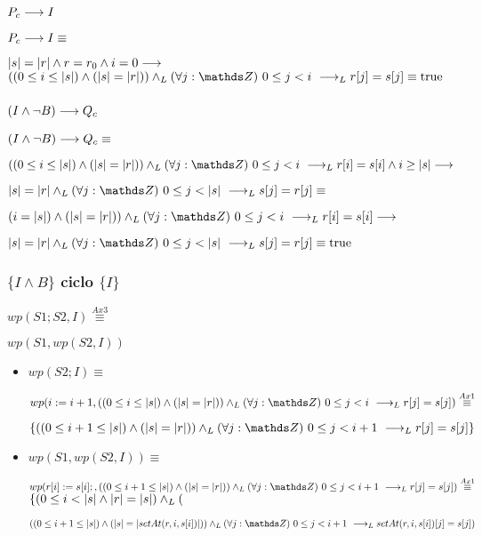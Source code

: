 \documentclass{article}
\begin{document}
\subsubsection*{$P_{c} \longrightarrow I$}

$P_{c} \longrightarrow I \equiv$

$|s| = |r| \wedge r = r_{0} \wedge i = 0 \longrightarrow$
$((0 \leq i \leq \longitud{s}) \wedge (\longitud{s} = \longitud{r})) \yLuego \paraTodo{j}{0}{i} \implicaLuego r[j] = s[j] \equiv \True$

\subsubsection*{$(I \wedge \neg B) \longrightarrow Q_{c}$}

$(I \wedge \neg B) \longrightarrow Q_{c} \equiv \\$

$((0 \leq i \leq \longitud{s}) \wedge (\longitud{s} = \longitud{r})) \yLuego \paraTodo{j}{0}{i} \implicaLuego r[i] = s[i] \wedge i \geq \longitud{s} \implica$

$\longitud{s} = \longitud{r} \yLuego \paraTodo{j}{0}{\longitud{s}} \implicaLuego s[j] = r[j] \equiv \\$

$(i = \longitud{s}) \wedge (\longitud{s} = \longitud{r})) \yLuego \paraTodo{j}{0}{i} \implicaLuego r[i] = s[i] \implica$

$\longitud{s} = \longitud{r} \yLuego \paraTodo{j}{0}{\longitud{s}} \implicaLuego s[j] = r[j] \equiv \True$

\subsubsection*{$\{I \wedge B\}$ ciclo $\{ I \}$}

$wp(S1;S2, I) \stackrel{Ax3}{\equiv}$

$wp(S1, wp(S2, I))$

\begin{itemize}
    \item $wp(S2; I) \equiv$

    $wp(i:= i+1, ((0 \leq i \leq \longitud{s}) \wedge (\longitud{s} = \longitud{r})) \yLuego \paraTodo{j}{0}{i} \implicaLuego r[j] = s[j]) \stackrel{Ax1}{\equiv}$

    $\{((0 \leq i+1 \leq \longitud{s}) \wedge (\longitud{s} = \longitud{r})) \yLuego \paraTodo{j}{0}{i+1} \implicaLuego r[j] = s[j] \}$

    \item $wp(S1, wp(S2, I)) \equiv$

    $wp(r[i] := s[i];, ((0 \leq i+1 \leq \longitud{s}) \wedge (\longitud{s} = \longitud{r})) \yLuego \paraTodo{j}{0}{i+1} \implicaLuego r[j] = s[j])\stackrel{Ax1}{\equiv}$\\

    $\{ (0 \leq i < |s| \wedge |r| = |s|) \land _L ($

    $ ((0 \leq i+1 \leq \longitud{s}) \wedge (\longitud{s} = \longitud{setAt(r,i,s[i])})) \yLuego \paraTodo{j}{0}{i+1} \implicaLuego setAt(r,i,s[i])[j] = s[j]) $

\end{itemize}
\end{document}
